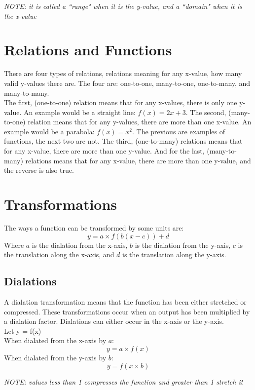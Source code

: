 \documentclass[a4paper,10pt]{report}
\begin{document}
\begin{center}
	\emph{NOTE:  it is called a ``range" when it is the y-value, and a ``domain" when it is the x-value}
\end{center}

\section{Relations and Functions}
There are four types of relations, relations meaning for any x-value, how many valid y-values there are.  The four are: one-to-one, many-to-one, one-to-many, and many-to-many.\\

The first, (one-to-one) relation means that for any x-values, there is only one y-value.  An example would be a straight line: $f(x) = 2x + 3$.  The second, (many-to-one) relation means that for any y-values, there are more than one x-value.  An example would be a parabola: $f(x) = x^2$.  The previous are examples of functions, the next two are not.  The third, (one-to-many) relations means that for any x-value, there are more than one y-value.  And for the last, (many-to-many) relations means that for any x-value, there are more than one y-value, and the reverse is also true.

\section{Transformations}
The ways a function can be transformed by some units are:
$$
	y = a \times f(b(x - c)) + d
$$
Where $a$ is the dialation from the x-axis, $b$ is the dialation from the y-axis, $c$ is the translation along the x-axis, and $d$ is the translation along the y-axis.

\subsection{Dialations}
A dialation transformation means that the function has been either stretched or compressed.  These transformations occur when an output has been multiplied by a dialation factor.  Dialations can either occur in the x-axis or the y-axis.\\
Let y = f(x)\\
When dialated from the x-axis by $a$:
$$
	y = a \times f(x)
$$
When dialated from the y-axis by $b$:
$$
	y = f(x \times b)
$$
\begin{center}
	\emph{NOTE:  values less than 1 compresses the function and greater than 1 stretch it}
\end{center}
\end{document}
